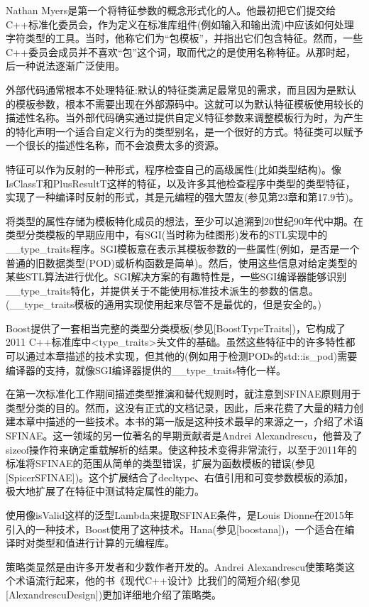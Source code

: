 Nathan Myers是第一个将特征参数的概念形式化的人。他最初把它们提交给C++标准化委员会，作为定义在标准库组件(例如输入和输出流)中应该如何处理字符类型的工具。当时，他称它们为“包模板”，并指出它们包含特征。然而，一些C++委员会成员并不喜欢“包”这个词，取而代之的是使用名称特征。从那时起，后一种说法逐渐广泛使用。

外部代码通常根本不处理特征:默认的特征类满足最常见的需求，而且因为是默认的模板参数，根本不需要出现在外部源码中。这就可以为默认特征模板使用较长的描述性名称。当外部代码确实通过提供自定义特征参数来调整模板行为时，为产生的特化声明一个适合自定义行为的类型别名，是一个很好的方式。特征类可以赋予一个很长的描述性名称，而不会浪费太多的资源。

特征可以作为反射的一种形式，程序检查自己的高级属性(比如类型结构)。像IsClassT和PlusResultT这样的特征，以及许多其他检查程序中类型的类型特征，实现了一种编译时反射的形式，其是元编程的强大盟友(参见第23章和第17.9节)。

将类型的属性存储为模板特化成员的想法，至少可以追溯到20世纪90年代中期。在类型分类模板的早期应用中，有SGI(当时称为硅图形)发布的STL实现中的\_\_type\_traits程序。SGI模板意在表示其模板参数的一些属性(例如，是否是一个普通的旧数据类型(POD)或析构函数是简单)。然后，使用这些信息对给定类型的某些STL算法进行优化。SGI解决方案的有趣特性是，一些SGI编译器能够识别\_\_type\_traits特化，并提供关于不能使用标准技术派生的参数的信息。(\_\_type\_traits模板的通用实现使用起来尽管不是最优的，但是安全的。)

Boost提供了一套相当完整的类型分类模板(参见[BoostTypeTraits])，它构成了2011 C++标准库中<type\_traits>头文件的基础。虽然这些特征中的许多特性都可以通过本章描述的技术实现，但其他的(例如用于检测PODs的std::is\_pod)需要编译器的支持，就像SGI编译器提供的\_\_type\_traits特化一样。

在第一次标准化工作期间描述类型推演和替代规则时，就注意到SFINAE原则用于类型分类的目的。然而，这没有正式的文档记录，因此，后来花费了大量的精力创建本章中描述的一些技术。本书的第一版是这种技术最早的来源之一，介绍了术语SFINAE。这一领域的另一位著名的早期贡献者是Andrei Alexandrescu，他普及了sizeof操作符来确定重载解析的结果。使这种技术变得非常流行，以至于2011年的标准将SFINAE的范围从简单的类型错误，扩展为函数模板的错误(参见[SpicerSFINAE])。这个扩展结合了decltype、右值引用和可变参数模板的添加，极大地扩展了在特征中测试特定属性的能力。

使用像isValid这样的泛型Lambda来提取SFINAE条件，是Louis Dionne在2015年引入的一种技术，Boost使用了这种技术。Hana(参见[boostana])，一个适合在编译时对类型和值进行计算的元编程库。

策略类显然是由许多开发者和少数作者开发的。Andrei Alexandrescu使策略类这个术语流行起来，他的书《现代C++设计》比我们的简短介绍(参见[AlexandrescuDesign])更加详细地介绍了策略类。
